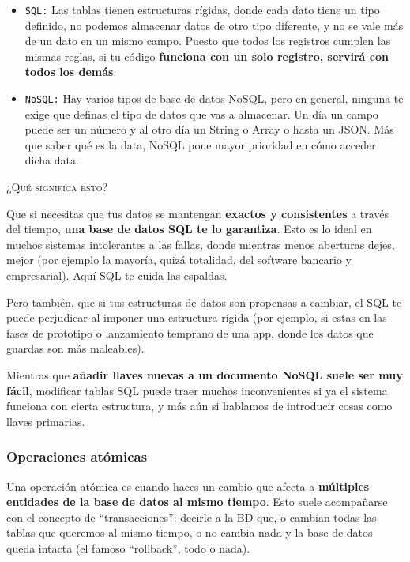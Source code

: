 \begin{itemize}

	\item \texttt{SQL:} Las tablas tienen estructuras rígidas, donde cada dato tiene un tipo definido, no podemos almacenar datos de otro tipo diferente, y no se vale más de un dato en un mismo campo. Puesto que todos los registros cumplen las mismas reglas, si tu código \textbf{funciona con un solo registro, servirá con todos los demás}.
	
	\item \texttt{NoSQL:} Hay varios tipos de base de datos NoSQL, pero en general, ninguna te exige que definas el tipo de datos que vas a almacenar. Un día un campo puede ser un número y al otro día un String o Array o hasta un JSON. Más que saber qué es la data, NoSQL pone mayor prioridad en cómo acceder dicha data.

\end{itemize}

\textsc{¿Qué significa esto?}

Que si necesitas que tus datos se mantengan \textbf{exactos y consistentes} a través del tiempo, \textbf{una base de datos SQL te lo garantiza}. Esto es lo ideal en muchos sistemas intolerantes a las fallas, donde mientras menos aberturas dejes, mejor (por ejemplo la mayoría, quizá totalidad, del software bancario y empresarial). Aquí SQL te cuida las espaldas.

Pero también, que si tus estructuras de datos son propensas a cambiar, el SQL te puede perjudicar al imponer una estructura rígida (por ejemplo, si estas en las fases de prototipo o lanzamiento temprano de una app, donde los datos que guardas son más maleables).

Mientras que \textbf{añadir llaves nuevas a un documento NoSQL suele ser muy fácil}, modificar tablas SQL puede traer muchos inconvenientes si ya el sistema funciona con cierta estructura, y más aún si hablamos de introducir cosas como llaves primarias.

\subsubsection*{Operaciones atómicas}

Una operación atómica es cuando haces un cambio que afecta a \textbf{múltiples entidades de la base de datos al mismo tiempo}. Esto suele acompañarse con el concepto de “transacciones”: decirle a la BD que, o cambian todas las tablas que queremos al mismo tiempo, o no cambia nada y la base de datos queda intacta (el famoso “rollback”, todo o nada).

